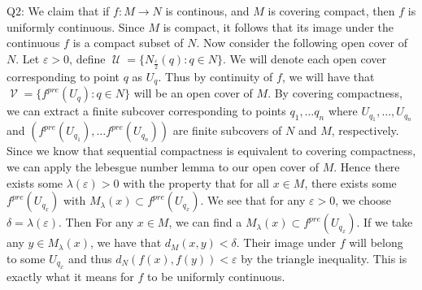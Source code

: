 \documentclass[letterpaper]{article}
\DeclareMathOperator{\V}{\mathcal{V}}
\DeclareMathOperator{\U}{\mathcal{U}}
\begin{document}
\noindent Q2: We claim that if $f:M\to N$ is continous, and $M$ is covering compact, then $f$ is uniformly continuous. Since $M$ is compact, it follows that its image under the continuous $f$ is a compact subset of $N$. Now consider the following open cover of $N$. Let $\varepsilon>0$, define $\U = \{ N_{\frac{\varepsilon}{2}}(q): q\in N\}$. 
We will denote each open cover corresponding to point $q$ as $U_q$. Thus by continuity of $f$, we will have that $\V =\{f^{pre}(U_q): q\in N\}$ will be an open cover of $M$. By covering compactness, we can extract a finite subcover corresponding to points $q_1,\dots q_n$ where $U_{q_1},\dots ,U_{q_n}$ and $(f^{pre}(U_{q_1}),\dots f^{pre}(U_{q_n}))$ are finite subcovers of $N$ and $M$, respectively.
Since we know that sequential compactness is equivalent to covering compactness, we can apply the lebesgue number lemma to our open cover of $M$. Hence there exists some $\lambda(\varepsilon)>0$ with the property that for all $x\in M$, there exists some $f^{pre}(U_{q_x})$ with $M_{\lambda}(x)\subset f^{pre}(U_{q_x})$. 
We see that for any $\varepsilon >0$, we choose $\delta = \lambda(\varepsilon)$. Then For any $x\in M$, we can find a $M_{\lambda}(x)\subset f^{pre}(U_{q_x})$. If we take any $y\in M_{\lambda}(x)$, we have that $d_{M}(x,y)<\delta$. Their image under $f$ will belong to some $U_{q_x}$ and thus $d_{N}(f(x),f(y))< \varepsilon$ by the triangle inequality. 
This is exactly what it means for $f$ to be uniformly continuous. 
\end{document}
